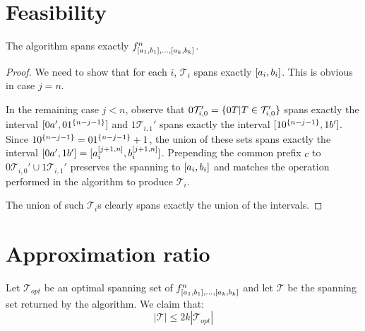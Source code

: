 \section{Feasibility}
\begin{theorem}
The algorithm spans exactly
$f^n_{[a_1, b_1], \ldots, [a_k, b_k]}$.
\end{theorem}

\begin{proof}
We need to show that for each $i$,
$\mathcal{T}_i$ spans exactly $[a_i, b_i]$.
This is obvious in case $j = n$.

In the remaining case $j < n$,
observe that
$0 \mathcal{T}_{i, 0}'
= \{0 T | T \in \mathcal{T}_{i, 0}'\}$
spans exactly the interval
$[0 a', 0 1^{\{n-j-1\}}]$
and $1 \mathcal{T}_{i, 1}'$
spans exactly the interval
$[1 0^{\{n-j-1\}}, 1 b']$.
Since $1 0^{\{n-j-1\}} = 0 1^{\{n-j-1\}} + 1$,
the union of these sets
spans exactly the interval
$[0 a', 1 b']
= [a_i^{[j+1, n]}, b_i^{[j+1, n]}]$.
Prepending the common prefix $c$ to
$0 \mathcal{T}_{i, 0}' \cup 1 \mathcal{T}_{i, 1}'$
preserves the spanning to
$[a_i, b_i]$
and matches the operation performed in the algorithm
to produce $\mathcal{T}_i$.

The union of such $\mathcal{T}_i$s clearly spans exactly
the union of the intervals.
\end{proof}

\section{Approximation ratio}


\begin{theorem}
\label{theorem:2kapproxratio}
Let $\mathcal{T}_{opt}$ be an optimal spanning set of
$f^n_{[a_1, b_1], \ldots, [a_k, b_k]}$
and let $\mathcal{T}$ be the spanning set returned
by the algorithm.
We claim that:
\begin{equation*}
|\mathcal{T}| \leq 2k |\mathcal{T}_{opt}|
\end{equation*}
\end{theorem}


